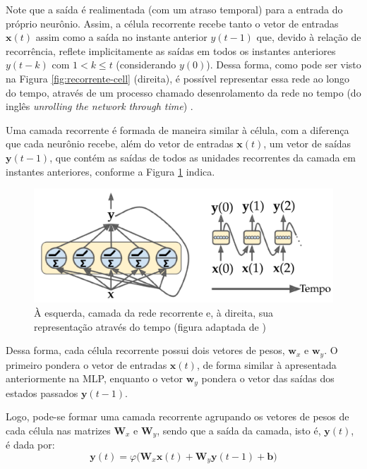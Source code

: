 \documentclass[a4paper, 12pt]{article}
\begin{document}
Note que a saída é realimentada (com um atraso temporal) para a entrada do próprio neurônio. Assim, a célula recorrente recebe tanto o vetor de entradas $\mathbf{x}(t)$ assim como a saída no instante anterior $y(t-1)$ que, devido à relação de recorrência, reflete implicitamente as saídas em todos os instantes anteriores $y(t-k)$ com $1 < k \leq t$ (considerando $y(0)$). Dessa forma, como pode ser visto na Figura \ref{fig:recorrente-cell} (direita), é possível representar essa rede ao longo do tempo, através de um processo chamado desenrolamento da rede no tempo (do inglês \textit{unrolling the network through time}) \cite{geron2019hands}.

Uma camada recorrente é formada de maneira similar à célula, com a diferença que cada neurônio recebe, além do vetor de entradas $\mathbf{x}(t)$, um vetor de saídas $\mathbf{y}(t-1)$, que contém as saídas de todos as unidades recorrentes da camada em instantes anteriores, conforme a Figura \ref{fig:recorrente-camada} indica. 
\begin{figure}[H]
\centering
\includegraphics[scale = 0.25]{rnn-layer.pdf}
\caption{À esquerda, camada da rede recorrente e, à direita, sua representação através do tempo (figura adaptada de \cite{geron2019hands})}
\label{fig:recorrente-camada}
\end{figure}

Dessa forma, cada célula recorrente possui dois vetores de pesos, $\mathbf{w}_x$ e $\mathbf{w}_y$. O primeiro pondera o vetor de entradas $\mathbf{x}(t)$, de forma similar à apresentada anteriormente na MLP, enquanto o vetor $\mathbf{w}_y$ pondera o vetor das saídas dos estados passados $\mathbf{y}(t-1)$.

Logo, pode-se formar uma camada recorrente agrupando os vetores de pesos de cada célula nas matrizes $\mathbf{W}_x$ e $\mathbf{W}_y$, sendo que a saída da camada, isto é, $\mathbf{y}(t)$, é dada por:
\begin{equation}\label{eq:rnn-layer}
\mathbf{y}(t) = \varphi \big(\mathbf{W}_x \mathbf{x}(t) + \mathbf{W}_y \mathbf{y}(t-1) + \mathbf{b} \big)
\end{equation}
\end{document}
